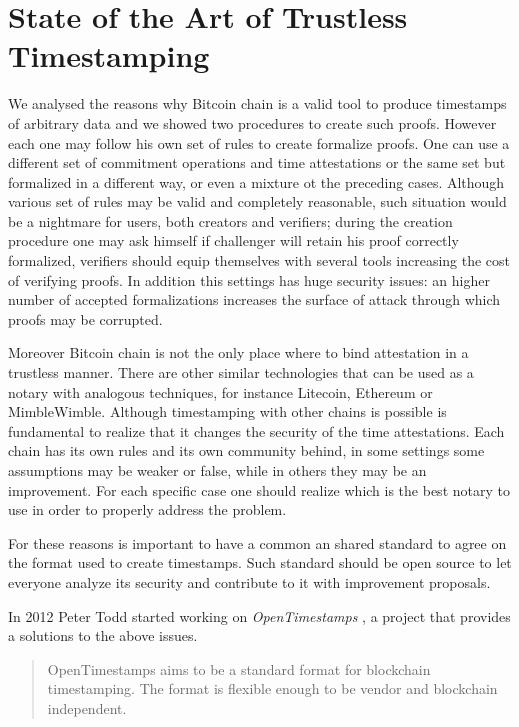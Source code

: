\chapter{State of the Art of Trustless Timestamping}
\label{chpr:state-of-art}
We analysed the reasons why Bitcoin chain is a valid tool to produce timestamps of arbitrary data and we showed two procedures to create such proofs.
However each one may follow his own set of rules to create formalize proofs. 
One can use a different set of commitment operations and time attestations or the same set but formalized in a different way, or even a mixture ot the preceding cases. 
Although various set of rules may be valid and completely reasonable, such situation would be a nightmare for users, both creators and verifiers; during the creation procedure one may ask himself if challenger will retain his proof correctly formalized, verifiers should equip themselves with several tools increasing the cost of verifying proofs.
In addition this settings has huge security issues: an higher number of accepted formalizations increases the surface of attack through which proofs may be corrupted. 

Moreover Bitcoin chain is not the only place where to bind attestation in a trustless manner. 
There are other similar technologies that can be used as a notary with analogous techniques, for instance Litecoin, Ethereum or MimbleWimble.
Although timestamping with other chains is possible is fundamental to realize that it changes the security of the time attestations.
Each chain has its own rules and its own community behind, in some settings some assumptions may be weaker or false, while in others they may be an improvement.
For each specific case one should realize which is the best notary to use in order to properly address the problem.

For these reasons is important to have a common an shared standard to agree on the format used to create timestamps. 
Such standard should be open source to let everyone analyze its security and contribute to it with improvement proposals.

In 2012 Peter Todd started working on \textit{OpenTimestamps} \cite{OTSWeb, OpenTimestampsGithub, OTSannouncment}, a project that provides a solutions to the above issues.

\begin{quotation}
	OpenTimestamps aims to be a standard format for blockchain timestamping. The format is flexible enough to be vendor and blockchain independent.
\end{quotation}

